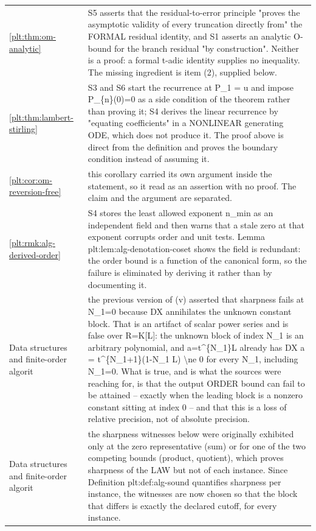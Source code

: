 \documentclass[11pt,oneside]{article}
\theoremstyle{plain}
\theoremstyle{definition}
\theoremstyle{remark}
\begin{document}
\begin{longtable}{@{}p{} p{}@{}}
\cref{plt:thm:om-analytic} & S5 asserts that the residual-to-error principle "proves the asymptotic validity of every truncation directly from" the FORMAL residual identity, and S1 asserts an analytic O-bound for the branch residual "by construction". Neither is a proof: a formal t-adic identity supplies no inequality. The missing ingredient is item (2), supplied below.\\
\cref{plt:thm:lambert-stirling} & S3 and S6 start the recurrence at P\_1 = u and impose P\_\{n\}(0)=0 as a side condition of the theorem rather than proving it; S4 derives the linear recurrence by "equating coefficients" in a NONLINEAR generating ODE, which does not produce it. The proof above is direct from the definition and proves the boundary condition instead of assuming it.\\
\cref{plt:cor:om-reversion-free} & this corollary carried its own argument inside the statement, so it read as an assertion with no proof. The claim and the argument are separated.\\
\cref{plt:rmk:alg-derived-order} & S4 stores the least allowed exponent n\_min as an independent field and then warns that a stale zero at that exponent corrupts order and unit tests. Lemma plt:lem:alg-denotation-coset shows the field is redundant: the order bound is a function of the canonical form, so the failure is eliminated by deriving it rather than by documenting it.\\
Data structures and finite-order algorit & the previous version of (v) asserted that sharpness fails at N\_1=0 because DX annihilates the unknown constant block. That is an artifact of scalar power series and is false over R=K[L]: the unknown block of index N\_1 is an arbitrary polynomial, and a=t\textasciicircum \{N\_1\}L already has DX a = t\textasciicircum \{N\_1+1\}(1-N\_1 L) \textbackslash ne 0 for every N\_1, including N\_1=0. What is true, and is what the sources were reaching for, is that the output ORDER bound can fail to be attained -- exactly when the leading block is a nonzero constant sitting at index 0 -- and that this is a loss of relative precision, not of absolute precision.\\
Data structures and finite-order algorit & the sharpness witnesses below were originally exhibited only at the zero representative (sum) or for one of the two competing bounds (product, quotient), which proves sharpness of the LAW but not of each instance. Since Definition plt:def:alg-sound quantifies sharpness per instance, the witnesses are now chosen so that the block that differs is exactly the declared cutoff, for every instance.\\

\end{longtable}
\end{document}
